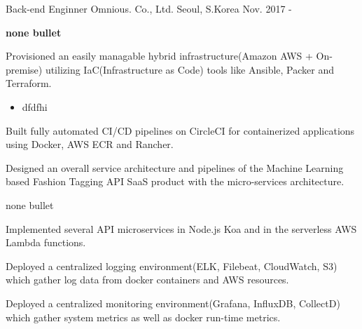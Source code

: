 

\begin{cventries}

  \cventry
    {Back-end Enginner} %
    {Omnious. Co., Ltd.} %
    {Seoul, S.Korea} %
    {Nov. 2017 - } %
    {
      \begin{cvitems} %
        \item[] {\textbf{none bullet}}
        \item {Provisioned an easily managable hybrid infrastructure(Amazon AWS + On-premise) utilizing IaC(Infrastructure as Code) tools like Ansible, Packer and Terraform.}
        \begin{itemize}
          \item {dfdfhi}
        \end{itemize}
        \item {Built fully automated CI/CD pipelines on CircleCI for containerized applications using Docker, AWS ECR and Rancher.}
        \item {Designed an overall service architecture and pipelines of the Machine Learning based Fashion Tagging API SaaS product with the micro-services architecture.}
        \item[] {none bullet}
        \item {Implemented several API microservices in Node.js Koa and in the serverless AWS Lambda functions.}
        \item {Deployed a centralized logging environment(ELK, Filebeat, CloudWatch, S3) which gather log data from docker containers and AWS resources.}
        \item {Deployed a centralized monitoring environment(Grafana, InfluxDB, CollectD) which gather system metrics as well as docker run-time metrics.}
      \end{cvitems}
    }


\end{cventries}
